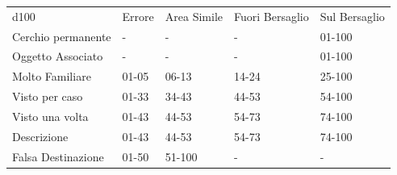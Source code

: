 \begin{multicols}{2}
\end{multicols}

\medskip

\noindent\begin{tabularx}{0.95\textwidth}{lllll}
\toprule
d100 &Errore&Area Simile&Fuori Bersaglio&Sul Bersaglio\\
Cerchio permanente&-&-&-&01-100\\
Oggetto Associato&-&-&-&01-100\\
Molto Familiare&01-05&06-13&14-24&25-100\\
Visto per caso&01-33&34-43&44-53&54-100\\
Visto una volta&01-43&44-53&54-73&74-100\\
Descrizione&01-43&44-53&54-73&74-100\\
Falsa Destinazione&01-50&51-100&-&-
\end{tabularx}

\medskip

